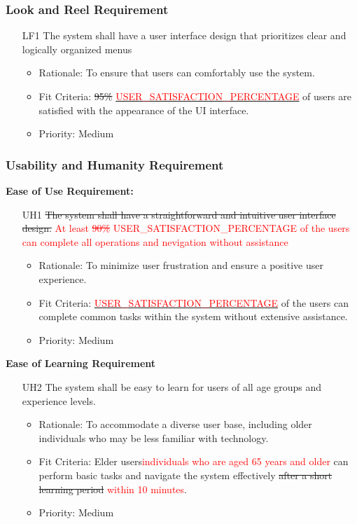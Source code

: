\documentclass[12pt]{article}
\begin{document}
\subsubsection{Look and Reel Requirement}
\begin{itemize}
    \item[LF1] The system shall have a user interface design that prioritizes clear and logically organized menus \label{LF1}
    \begin{itemize}
        \item Rationale: To ensure that users can comfortably use the system.
        \item Fit Criteria: \sout{95\%} \hyperref[sec:symbolic-constants]{\textcolor{red}{USER\_SATISFACTION\_PERCENTAGE}} of users are satisfied with the appearance of the UI interface.
        \item Priority: Medium
    \end{itemize}
\end{itemize}
\subsubsection{Usability and Humanity Requirement}
\textbf{Ease of Use Requirement:}
\begin{itemize}
    \item[UH1] \sout{The system shall have a straightforward and intuitive user interface design.}
    \textcolor{red}{At least \sout{90\%} \textcolor{red}{USER\_SATISFACTION\_PERCENTAGE} of the users can complete all operations and nevigation without assistance} \label{UH1}
    \begin{itemize}
        \item Rationale: To minimize user frustration and ensure a positive user experience.
        \item Fit Criteria: \hyperref[sec:symbolic-constants]{\textcolor{red}{USER\_SATISFACTION\_PERCENTAGE}} of the users can complete common tasks within the system without extensive assistance.
        \item Priority: Medium
    \end{itemize}
\end{itemize}
\textbf{Ease of Learning Requirement}
\begin{itemize}
    \item[UH2] The system shall be easy to learn for users of all age groups and experience levels. \label{UH2}
    \begin{itemize}
        \item Rationale: To accommodate a diverse user base, including older individuals who may be less familiar with technology.
        \item Fit Criteria: Elder users\textcolor{red}{individuals who are aged 65 years and older} can perform basic tasks and navigate the system effectively \sout{after a short learning period}
        \textcolor{red}{within 10 minutes}.
        \item Priority: Medium
    \end{itemize}
\end{itemize}
\end{document}
